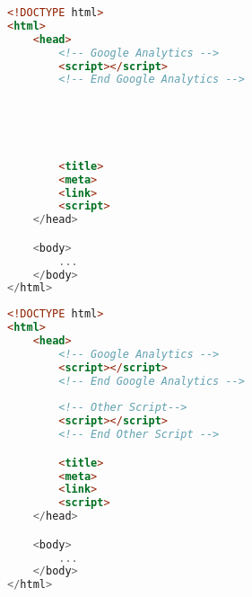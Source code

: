 


\begin{sidewaysfigure}

\begin{multicols}{2}

\begin{center}
\begin{lstlisting}[caption={Other Script 1}, language=html, numbers=none]
<!DOCTYPE html>
<html>
    <head>
        <!-- Google Analytics -->
        <script></script>
        <!-- End Google Analytics -->
        




        <title>
        <meta>
        <link>
        <script>
    </head>

    <body>
        ...
    </body>
</html>
\end{lstlisting}
\end{center}

\columnbreak

\begin{center}
\begin{lstlisting}[caption={Other Script 2}, language=html, numbers=none]
<!DOCTYPE html>
<html>
    <head>
        <!-- Google Analytics -->
        <script></script>
        <!-- End Google Analytics -->
        
        <!-- Other Script-->
        <script></script>
        <!-- End Other Script -->

        <title>
        <meta>
        <link>
        <script>
    </head>

    <body>
        ...
    </body>
</html>
\end{lstlisting}
\end{center}


\end{multicols}

\end{sidewaysfigure}













